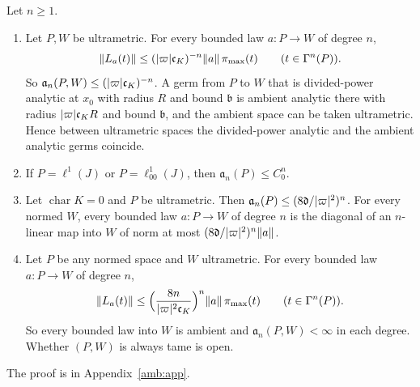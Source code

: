 \begin{theorem}[examples]\label{amb:thm:tame-examples}
Let $n\ge1$.
\begin{enumerate}
\item Let $P,W$ be ultrametric. For every bounded law $a\colon P\to W$ of degree $n$,
\begin{equation}\label{amb:eq:pimax}
 \lVert L_a(t)\rVert\le(\lvert \varpi\rvert\mathfrak c_K)^{-n}\lVert a\rVert\,\pi_{\max}(t)\qquad(t\in\Gamma^n(P)).
\end{equation}
So $\mathfrak a_n(P,W)\le(\lvert \varpi\rvert\mathfrak c_K)^{-n}$. A germ from $P$ to $W$ that is divided-power analytic at $x_0$ with radius $R$ and bound $\mathfrak b$ is ambient analytic there with radius $\lvert \varpi\rvert\mathfrak c_KR$ and bound $\mathfrak b$, and the ambient space can be taken ultrametric. Hence between ultrametric spaces the divided-power analytic and the ambient analytic germs coincide.
\item If $P=\ell^1(J)$ or $P=\ell^1_{00}(J)$, then $\mathfrak a_n(P)\le C_0^n$.
\item Let $\operatorname{char}K=0$ and $P$ be ultrametric. Then $\mathfrak a_n(P)\le(8\mathfrak d/\lvert \varpi\rvert^2)^n$. For every normed $W$, every bounded law $a\colon P\to W$ of degree $n$ is the diagonal of an $n$-linear map into $W$ of norm at most $(8\mathfrak d/\lvert \varpi\rvert^2)^n\lVert a\rVert$.
\item Let $P$ be any normed space and $W$ ultrametric. For every bounded law $a\colon P\to W$ of degree $n$,
\begin{equation}\label{amb:eq:hull}
 \lVert L_a(t)\rVert\le\Bigl(\frac{8n}{\lvert \varpi\rvert^2\mathfrak c_K}\Bigr)^n\lVert a\rVert\,\pi_{\max}(t)\qquad(t\in\Gamma^n(P)).
\end{equation}
So every bounded law into $W$ is ambient and $\mathfrak a_n(P,W)<\infty$ in each degree. Whether $(P,W)$ is always tame is open.
\end{enumerate}
\end{theorem}
The proof is in Appendix~\ref{amb:app}.

